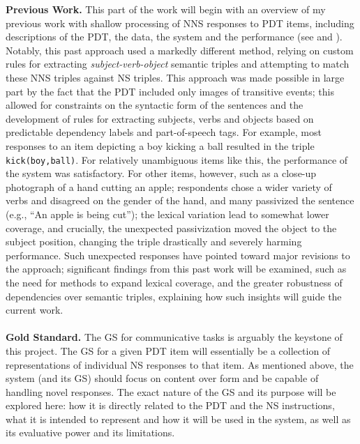 \textbf{Previous Work.} This part of the work will begin with an overview of my previous work with shallow processing of NNS responses to PDT items, including descriptions of the PDT, the data, the system and the performance (see \citet{king:dickinson:13} and \citet{king:dickinson:14}). Notably, this past approach used a markedly different method, relying on custom rules for extracting \textit{subject-verb-object} semantic triples and attempting to match these NNS triples against NS triples. This approach was made possible in large part by the fact that the PDT included only images of transitive events; this allowed for constraints on the syntactic form of the sentences and the development of rules for extracting subjects, verbs and objects based on predictable dependency labels and part-of-speech tags. For example, most responses to an item depicting a boy kicking a ball resulted in the triple \texttt{kick(boy,ball)}. For relatively unambiguous items like this, the performance of the system was satisfactory. For other items, however, such as a close-up photograph of a hand cutting an apple; respondents chose a wider variety of verbs and disagreed on the gender of the hand, and many passivized the sentence (e.g., ``An apple is being cut''); the lexical variation lead to somewhat lower coverage, and crucially, the unexpected passivization moved the object to the subject position, changing the triple drastically and severely harming performance. Such unexpected responses have pointed toward major revisions to the approach; significant findings from this past work will be examined, such as the need for methods to expand lexical coverage, and the greater robustness of dependencies over semantic triples, explaining how such insights will guide the current work.\\
\\
\textbf{Gold Standard.} The GS for communicative tasks is arguably the keystone of this project. The GS for a given PDT item will essentially be a collection of representations of individual NS responses to that item. As mentioned above, the system (and its GS) should focus on content over form and be capable of handling novel responses. The exact nature of the GS and its purpose will be explored here: how it is directly related to the PDT and the NS instructions, what it is intended to represent and how it will be used in the system, as well as its evaluative power and its limitations. %
